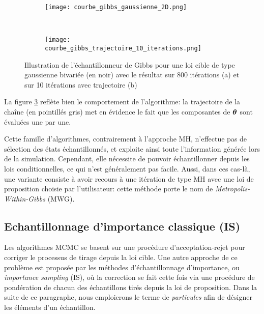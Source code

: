 \begin{figure}[h!]
	\centering
	\begin{subfigure}[t]{0.5\textwidth}
		\centering
		\texttt{[image: courbe\_gibbs\_gaussienne\_2D.png]}
		\caption{}
		\label{subfig_gibbs_all}
	\end{subfigure}%
	~ 
	\begin{subfigure}[t]{0.5\textwidth}
		\centering
		\texttt{[image: courbe\_gibbs\_trajectoire\_10\_iterations.png]}
		\caption{}
		\label{subfig_gibbs_10}
	\end{subfigure}
	\caption{Illustration de l'échantillonneur de Gibbs pour une loi cible de type gaussienne bivariée (en noir) avec le résultat sur 800 itérations (a) et sur 10 itérations avec trajectoire (b)}
\end{figure}

La figure \ref{subfig_gibbs_10} reflète bien le comportement de l'algorithme: la trajectoire de la chaîne (en pointillés gris) met en évidence le fait que les composantes de ${\bm{\theta}}$ sont évaluées une par une. 

Cette famille d'algorithmes, contrairement à l'approche MH, n'effectue pas de sélection des états échantillonnés, et exploite ainsi toute l'information générée lors de la simulation. Cependant, elle nécessite de pouvoir échantillonner depuis les lois conditionnelles, ce qui n'est généralement pas facile. Aussi, dans ces cas-là, une variante consiste à avoir recours à une itération de type MH avec une loi de proposition choisie par l'utilisateur: cette méthode porte le nom de \textit{Metropolis-Within-Gibbs} (MWG).\\

 
 \subsection{Echantillonnage d'importance classique (IS)}
 
{Les algorithmes MCMC se basent sur une procédure d'acceptation-rejet pour corriger le processus de tirage depuis la loi cible. Une autre approche de ce problème est proposée par les méthodes d'échantillonnage d'importance, ou \textit{importance sampling} (IS), où la correction se fait cette fois via une procédure de pondération de chacun des échantillons tirés depuis la loi de proposition.}
 Dans la suite de ce paragraphe, nous emploierons le terme de \textit{particules} afin de désigner les éléments d'un échantillon.\\
 
